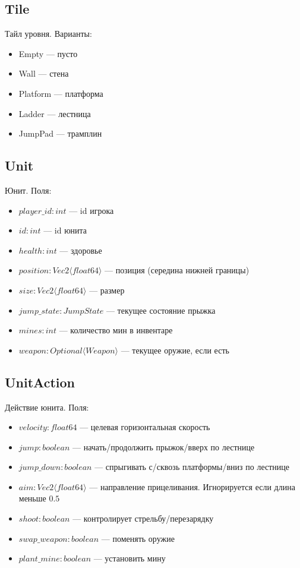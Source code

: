 \subsection{Tile}
Тайл уровня. Варианты:
\begin{itemize}
    \item Empty --- пусто
    \item Wall --- стена
    \item Platform --- платформа
    \item Ladder --- лестница
    \item JumpPad --- трамплин
\end{itemize}

\subsection{Unit}
Юнит. Поля:
\begin{itemize}
    \item $player\_id : int$ --- id игрока
    \item $id : int$ --- id юнита
    \item $health : int$ --- здоровье
    \item $position : Vec2 \langle float64 \rangle$ --- позиция (середина нижней границы)
    \item $size : Vec2 \langle float64 \rangle$ --- размер
    \item $jump\_state : JumpState$ --- текущее состояние прыжка
    \item $mines : int$ --- количество мин в инвентаре
    \item $weapon : Optional \langle Weapon \rangle$ --- текущее оружие, если есть
\end{itemize}

\subsection{UnitAction}
Действие юнита. Поля:
\begin{itemize}
    \item $velocity : float64$ --- целевая горизонтальная скорость
    \item $jump : boolean$ --- начать/продолжить прыжок/вверх по лестнице
    \item $jump\_down : boolean$ --- спрыгивать с/сквозь платформы/вниз по лестнице
    \item $aim : Vec2 \langle float64 \rangle$ --- направление прицеливания. Игнорируется если длина меньше $0.5$
    \item $shoot : boolean$ --- контролирует стрельбу/перезарядку
    \item $swap\_weapon : boolean$ --- поменять оружие
    \item $plant\_mine : boolean$ --- установить мину
\end{itemize}

